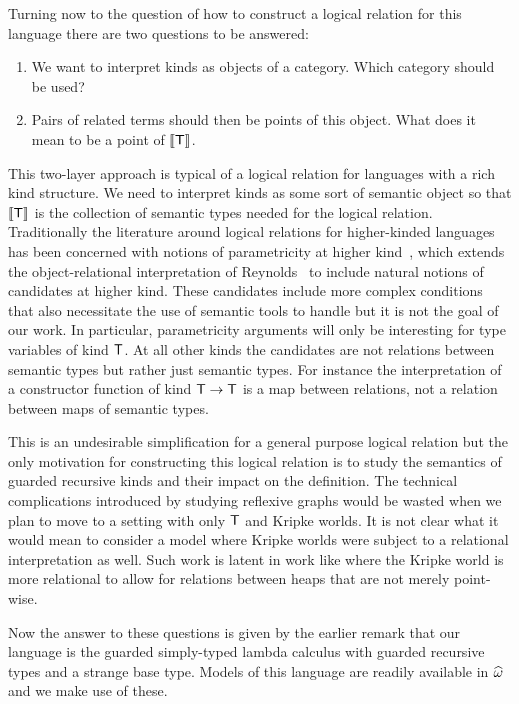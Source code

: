 Turning now to the question of how to construct a logical relation for
this language there are two questions to be answered:
\begin{enumerate}
\item We want to interpret kinds as objects of a category. Which
  category should be used?
\item Pairs of related terms should then be points of this object.
  What does it mean to be a point of $\llbracket \mathsf{T} \rrbracket$.
\end{enumerate}
This two-layer approach is typical of a logical relation for languages
with a rich kind structure. We need to interpret kinds as some sort of
semantic object so that $\llbracket \mathsf{T} \rrbracket$ is the collection of semantic
types needed for the logical relation. Traditionally the literature
around logical relations for higher-kinded languages has been
concerned with notions of parametricity at higher
kind~\citep{Hasegawa:94,Robinson:94,Dunphy:04,Vytiniotis:10,Atkey:12},
which extends the object-relational interpretation of
Reynolds~\citep{Reynolds:83} to include natural
notions of candidates at higher kind. These candidates include more
complex conditions that also necessitate the use of semantic tools to
handle but it is not the goal of our work. In particular,
parametricity arguments will only be interesting for type variables of
kind $\mathsf{T}$. At all other kinds the candidates are not relations
between semantic types but rather just semantic types. For instance
the interpretation of a constructor function of kind $\mathsf{T} \to \mathsf{T}$
is a map between relations, not a relation between maps of semantic
types.

This is an undesirable simplification for a general purpose logical
relation but the only motivation for constructing this logical
relation is to study the semantics of guarded recursive kinds and
their impact on the definition. The technical complications introduced
by studying reflexive graphs would be wasted when we plan to move to a
setting with only $\mathsf{T}$ and Kripke worlds. It is not clear what it
would mean to consider a model where Kripke worlds were subject to a
relational interpretation as well. Such work is latent in work like
\citet{Dreyer:10} where the Kripke world is more relational to allow
for relations between heaps that are not merely point-wise.

Now the answer to these questions is given by the earlier remark that
our language is the guarded simply-typed lambda calculus with guarded
recursive types and a strange base type. Models of this language are
readily available in $\widehat{\omega}$~\citep{Birkedal:guarded:10,Birkedal:steps:11} and we
make use of these.

